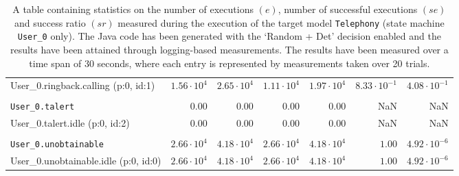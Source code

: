 \begin{table}[htbp]
{\begin{tabular}{lrrrrrr}
\hspace{3mm}User\_0.ringback.calling (p:0, id:1)     & $1.56 \cdot 10^{4}$ & $2.65 \cdot 10^{4}$ & $1.11 \cdot 10^{4}$ & $1.97 \cdot 10^{4}$ & $8.33 \cdot 10^{-1}$ & $4.08 \cdot 10^{-1}$ \\
\\[-8pt]\texttt{User\_0.talert}                      &              $0.00$ &              $0.00$ &              $0.00$ &              $0.00$ &                  NaN &                  NaN \\
\hspace{3mm}User\_0.talert.idle (p:0, id:2)          &              $0.00$ &              $0.00$ &              $0.00$ &              $0.00$ &                  NaN &                  NaN \\
\\[-8pt]\texttt{User\_0.unobtainable}                & $2.66 \cdot 10^{4}$ & $4.18 \cdot 10^{4}$ & $2.66 \cdot 10^{4}$ & $4.18 \cdot 10^{4}$ &               $1.00$ & $4.92 \cdot 10^{-6}$ \\
\hspace{3mm}User\_0.unobtainable.idle (p:0, id:0)    & $2.66 \cdot 10^{4}$ & $4.18 \cdot 10^{4}$ & $2.66 \cdot 10^{4}$ & $4.18 \cdot 10^{4}$ &               $1.00$ & $4.92 \cdot 10^{-6}$ \\
\bottomrule
\end{tabular}
}
\caption{A table containing statistics on the number of executions $(e)$, number of successful executions $(se)$ and success ratio $(sr)$ measured during the execution of the target model \texttt{Telephony} (state machine \texttt{User\_0} only). The Java code has been generated with the `Random + Det' decision enabled and the results have been attained through logging-based measurements. The results have been measured over a time span of 30 seconds, where each entry is represented by measurements taken over 20 trials.}
\label{table:frequency_results_telephony_logging_user_0}
\end{table}